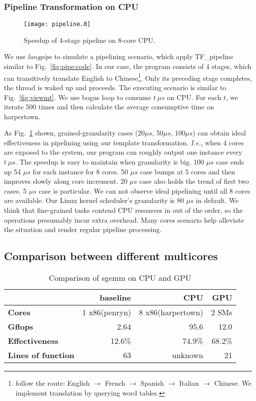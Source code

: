 \subsubsection{Pipeline Transformation on CPU}\label{exp:4}
\begin{figure}[htp]
\texttt{[image: pipeline.0]}
\caption{Speedup of 4-stage pipeline on 8-core CPU.}\label{fig:pipe}
\end{figure}

We use \textit{langpipe} to simulate a pipelining scenario, which apply TF\_pipeline similar to Fig.~\ref{fig:pipe:code}. In our case, the program consists of 4 stages,
which can transitively translate English to Chinese\footnote{follow the 
  route: English  $\to$ French $\to$ Spanish $\to$ Italian $\to$
  Chinese. We implement translation by querying word tables.}. Only its preceding stage completes,  the thread is waked
up and proceeds. The executing scenario is similar to Fig.~\ref{fig:viewmt}. We use bogus loop to consume $t \  \mu s$ on CPU. For each $t$, we iterate 500
times and then calculate the average consumptive time on harpertown. 

As Fig.~\ref{fig:pipe} shown, grained-granularity cases (20$\mu s$,
50$\mu s$, 100$\mu s$) can obtain ideal
effectiveness in pipelining using our template transformation.  
\textit{I.e.},  when 4 cores are exposed to the system, our program can roughly output one instance every $t\  \mu
s$. The speedup is easy to maintain when granularity is big. 100 $\mu s$ case ends up 54 $\mu s$ for each instance for 8 cores. 50  $\mu s$ case
bumps at 5 cores and then improves slowly along core increment. 20
$\mu s$ case also holds the trend of first two cases. 5 $\mu s$ case is
particular. We can not observe ideal pipelining until all 8
cores are available.  Our Linux kernel scheduler's granularity is 80
$\mu s$ in default. We think that fine-grained tasks contend
CPU resources in out of the order, so the operations presumably
incur extra overhead. Many cores scenario help alleviate the
situation and render regular pipeline processing.

\subsection{Comparison between different multicores}\label{exp:3}
\begin{table}[hbt]
\caption{Comparison of sgemm on CPU and GPU}\label{tbl:sgemm}
\begin{tabular}{|l|r|r|r|}
\hline
& baseline& CPU & GPU\\
\hline
\textbf{Cores} &1 x86(penryn)& 8 x86(harpertown)& 2 SMs\\
\hline
\textbf{Gflops}& 2.64 &95.6&  12.0\\
\hline
\textbf{Effectiveness}&12.6\%& 74.9\%&68.2\%\\
\hline
\textbf{Lines of function}&63&unknown&21\\
\hline
\end{tabular}
\end{table}

